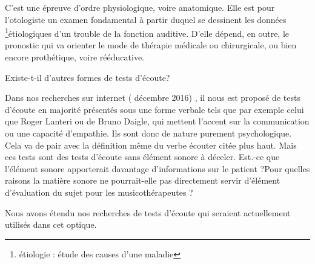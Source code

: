 C'est une épreuve d'ordre physiologique, voire anatomique.\emph{ }Elle
est pour l\textquoteright otologiste
un examen fondamental à partir duquel se dessinent les données \footnote{étiologie : étude des causes d'une maladie}étiologiques
d'un trouble de la fonction auditive. D'elle dépend, en outre, le
pronostic qui va orienter le mode de thérapie médicale ou chirurgicale,
ou bien encore prothétique, voire rééducative. 

Existe-t-il d'autres formes de tests d'écoute?

Dans nos recherches sur internet ( décembre 2016) , il nous est proposé
de tests d'écoute en majorité présentés sous une forme verbale tels
que par exemple celui que Roger Lanteri ou de Bruno Daigle, qui mettent
l'accent sur la communication ou une capacité d'empathie. Ils sont
donc de nature purement psychologique. Cela va de pair avec la définition
même du verbe écouter citée plus haut. Mais ces tests sont des tests
d'écoute sans élément sonore à déceler. Est.-ce que l'élément sonore
apporterait davantage d'informations sur le patient ?Pour quelles
raisons la matière sonore ne pourrait-elle pas directement servir
d'élément d'évaluation du sujet pour les musicothérapeutes ? 

Nous avons étendu nos recherches de tests d'écoute qui seraient actuellement
utilisés dans cet optique.

